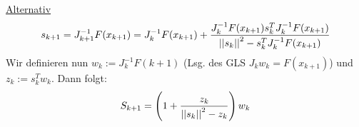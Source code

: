 \underline{Alternativ}
\begin{align*}
    s_{k+1} = J_{k+1}^{-1} F(x_{k+1})= J_{k}^{-1} F(x_{k+1}) + \frac{J_k^{-1} F(x_{k+1}) s_k^T J_k^{-1} F(x_{k+1})}{\left\vert\left\vert s_k \right\vert\right\vert^2 - s_k^T J_k^{-1} F(x_{k+1})}
\end{align*}
Wir definieren nun $w_k := J_{k}^{-1} F(k+1)$ (Lsg. des GLS $J_k w_k = F(x_{k+1})$)
und $z_k := s_k^T w_k$.
Dann folgt:
\begin{align*}
    S_{k+1} = \left( 1 + \frac{z_k}{\left\vert\left\vert s_k \right\vert\right\vert^2 - z_k} \right) w_k
\end{align*}

